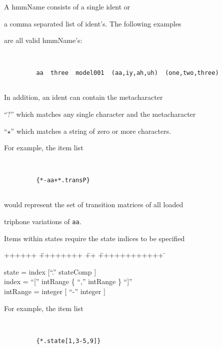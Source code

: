 \noindent


A {\sf hmmName} consists of a single {\sf ident} or


a comma separated list of {\sf ident}'s.  The following examples


are all valid {\sf hmmName}'s:


\begin{verbatim}


         aa  three  model001  (aa,iy,ah,uh)  (one,two,three)


\end{verbatim}


In addition, an {\sf ident} can contain the metacharacter


``?'' which matches any single character and the metacharacter


``$\star$'' which matches a string of zero or more characters.


For example, the item list


\begin{verbatim}


         {*-aa+*.transP}


\end{verbatim}


would represent the set of transition matrices of all loaded


triphone variations of \texttt{aa}.





Items within states require the state indices to be specified


{\sf


\begin{tabbing}


++++++ \= ++++++++ \= ++ \= ++++++++++++ \=  \kill


\>      state \>  = \> index [``.'' stateComp ] \\


\>      index \>  = \> ``['' intRange \{ ``,'' intRange \} ``]'' \\


\>    intRange \> = \> integer [ ``-'' integer ]


\end{tabbing}}


For example, the item list


\begin{verbatim}


         {*.state[1,3-5,9]}


\end{verbatim}


